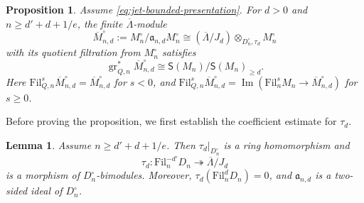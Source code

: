\documentclass[11pt]{article}
\newtheorem{proposition}[theorem]{Proposition}
\newtheorem{lemma}[theorem]{Lemma}
\theoremstyle{definition}
\newcommand{\gr}{\operatorname{gr}}
\newcommand{\im}{\operatorname{Im}}
\begin{document}
\begin{proposition}
\label{prop:analytic-finite-jet-recovery}
Assume \eqref{eq:jet-bounded-presentation}. For $d>0$ and
$n\geq d'+d+1/e$, the finite $\overline\Lambda$-module
\[
 \overline{M}_{n,d}^{\circ}:=M_n^\circ/\mathfrak a_{n,d}M_n^\circ
 \cong(\overline\Lambda/J_d)\otimes_{D_n^\circ,\tau_d}M_n^\circ
\]
with its quotient filtration from $M_n^\circ$ satisfies
\[
 \gr_{Q,n}^*\overline{M}_{n,d}^{\circ}
 \cong\mathsf S(M_n)/\mathsf S(M_n)_{\geq d}.
\]
Here $\mathrm{Fil}_{Q,n}^s\overline{M}_{n,d}^{\circ}=\overline{M}_{n,d}^{\circ}$ for $s<0$, and
$\mathrm{Fil}_{Q,n}^s\overline{M}_{n,d}^{\circ}=\im(\mathrm{Fil}_n^sM_n\to \overline{M}_{n,d}^{\circ})$
for $s\geq0$.
\end{proposition}

Before proving the proposition, we first establish the coefficient
estimate for $\tau_d$.

\begin{lemma}\label{lem:analytic-jet-truncation}
Assume $n\geq d'+d+1/e$. Then $\tau_d|_{D_n^\circ}$ is a ring homomorphism and
\[
 \tau_d:\mathrm{Fil}_n^{-d'}D_n\twoheadrightarrow\overline\Lambda/J_d
\]
is a morphism of $D_n^\circ$-bimodules.
Moreover, $\tau_d(\mathrm{Fil}_n^dD_n)=0$, and
$\mathfrak a_{n,d}$ is a two-sided ideal of $D_n^\circ$.
\end{lemma}
\end{document}
